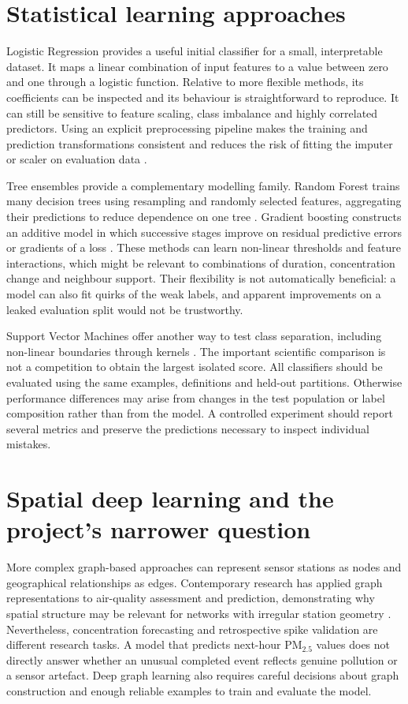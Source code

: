 \documentclass[12pt,a4paper,oneside]{report}
\newcommand{\pmf}{PM$_{2.5}$}
\begin{document}
\section{Statistical learning approaches}
Logistic Regression provides a useful initial classifier for a small, interpretable dataset. It maps a linear combination of input features to a value between zero and one through a logistic function. Relative to more flexible methods, its coefficients can be inspected and its behaviour is straightforward to reproduce. It can still be sensitive to feature scaling, class imbalance and highly correlated predictors. Using an explicit preprocessing pipeline makes the training and prediction transformations consistent and reduces the risk of fitting the imputer or scaler on evaluation data \citep{pedregosa2011}.

Tree ensembles provide a complementary modelling family. Random Forest trains many decision trees using resampling and randomly selected features, aggregating their predictions to reduce dependence on one tree \citep{breiman2001}. Gradient boosting constructs an additive model in which successive stages improve on residual predictive errors or gradients of a loss \citep{friedman2001}. These methods can learn non-linear thresholds and feature interactions, which might be relevant to combinations of duration, concentration change and neighbour support. Their flexibility is not automatically beneficial: a model can also fit quirks of the weak labels, and apparent improvements on a leaked evaluation split would not be trustworthy.

Support Vector Machines offer another way to test class separation, including non-linear boundaries through kernels \citep{cortes1995}. The important scientific comparison is not a competition to obtain the largest isolated score. All classifiers should be evaluated using the same examples, definitions and held-out partitions. Otherwise performance differences may arise from changes in the test population or label composition rather than from the model. A controlled experiment should report several metrics and preserve the predictions necessary to inspect individual mistakes.

\section{Spatial deep learning and the project's narrower question}
More complex graph-based approaches can represent sensor stations as nodes and geographical relationships as edges. Contemporary research has applied graph representations to air-quality assessment and prediction, demonstrating why spatial structure may be relevant for networks with irregular station geometry \citep{chabalala2026}. Nevertheless, concentration forecasting and retrospective spike validation are different research tasks. A model that predicts next-hour \pmf{} values does not directly answer whether an unusual completed event reflects genuine pollution or a sensor artefact. Deep graph learning also requires careful decisions about graph construction and enough reliable examples to train and evaluate the model.
\end{document}
